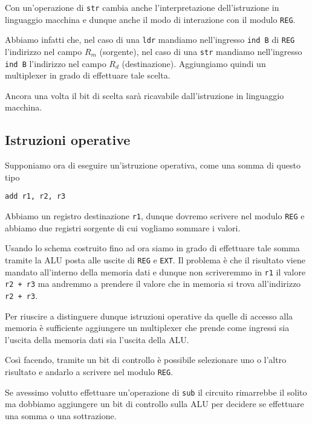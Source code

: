 Con un'operazione di \verb|str| cambia anche l'interpretazione dell'istruzione in linguaggio
macchina e dunque anche il modo di interazione con il modulo \verb|REG|.

Abbiamo infatti che, nel caso di una \verb|ldr| mandiamo nell'ingresso \verb|ind B| di \verb|REG|
l'indirizzo nel campo $R_m$ (sorgente), nel caso di una \verb|str| mandiamo nell'ingresso
\verb|ind B| l'indirizzo nel campo $R_d$ (destinazione). Aggiungiamo quindi un multiplexer in grado
di effettuare tale scelta.
\begin{center}
	
\end{center}
Ancora una volta il bit di scelta sarà ricavabile dall'istruzione in linguaggio macchina.

\subsection{Istruzioni operative}
Supponiamo ora di eseguire un'istruzione operativa, come una somma di questo tipo
\begin{verbatim}
add r1, r2, r3
\end{verbatim}
Abbiamo un registro destinazione \verb|r1|, dunque dovremo scrivere nel modulo \verb|REG| e abbiamo
due registri sorgente di cui vogliamo sommare i valori.

Usando lo schema costruito fino ad ora siamo in grado di effettuare tale somma tramite la ALU posta
alle uscite di \verb|REG| e \verb|EXT|. Il problema è che il risultato viene mandato all'interno
della memoria dati e dunque non scriveremmo in \verb|r1| il valore \verb|r2 + r3| ma andremmo a
prendere il valore che in memoria si trova all'indirizzo \verb|r2 + r3|.

Per riuscire a distinguere dunque istruzioni operative da quelle di accesso alla memoria è
sufficiente aggiungere un multiplexer che prende come ingressi sia l'uscita della memoria dati sia
l'uscita della ALU.
\begin{center}
	
\end{center}
Così facendo, tramite un bit di controllo è possibile selezionare uno o l'altro risultato e andarlo
a scrivere nel modulo \verb|REG|.

Se avessimo volutto effettuare un'operazione di \verb|sub| il circuito rimarrebbe il solito ma
dobbiamo aggiungere un bit di controllo sulla ALU per decidere se effettuare una somma o una
sottrazione.

